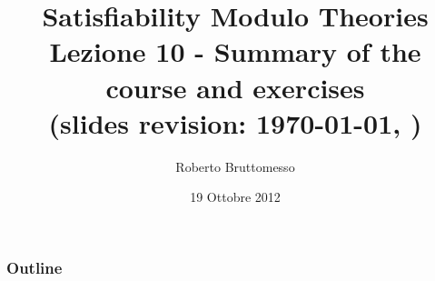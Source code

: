 \documentclass[xcolor=dvipsnames
              ,handout
              ]{beamer}
\title[Summary and Exercises]{Satisfiability Modulo Theories\\ Lezione 10 - Summary of the course and exercises \\ {\tiny (slides revision: \today, \currenttime)}}
\author[R. Bruttomesso]{\large Roberto Bruttomesso}
\date{19 Ottobre 2012}
\institute[SMT]{\large Seminario di Logica Matematica \\(Corso Prof. Silvio Ghilardi)}
\begin{document}
\frame{\titlepage}

\begin{frame}
  \frametitle{Outline}
  \tableofcontents
\end{frame}







\end{document}
